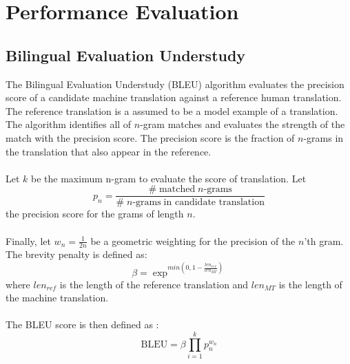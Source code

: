\section{Performance Evaluation}
\subsection{Bilingual Evaluation Understudy}
The Bilingual Evaluation Understudy (BLEU) algorithm evaluates the precision score of a candidate machine translation against a reference human translation. The reference translation is a assumed to be a model example of a translation. The algorithm identifies all of $n$-gram matches and evaluates the strength of the match with the precision score. The precision score is the fraction of $n$-grams in the translation that also appear in the reference.
\\\\
Let $k$ be the maximum n-gram to evaluate the score of translation. Let
\begin{equation}
\label{eq:5.1}
p_n = \frac{\# \; \text{matched} \; n\text{-grams}}{\# \; n\text{-grams} \; \text{in candidate translation}}
\end{equation}
the precision score for the grams of length $n$. 
\\\\
Finally, let $w_n = \frac{1}{2n}$  be a geometric weighting for the precision of the $n$'th gram. The brevity penalty is defined as:
\begin{equation}
\label{eq:5.2}
\beta = \exp ^ {min \left(0, 1 - \frac{len_{ref}}{len_{MT}} \right)}
\end{equation}
where $len_{ref}$ is the length of the reference translation and $len_{MT}$ is the length of the machine translation.
\\\\
The BLEU score is then defined as \cite{manning2019cs224n}:
\begin{equation}
\label{eq:5.3}
\text{BLEU} = \beta \prod _{i = 1} ^ k p_n ^{w_n}
\end{equation}

